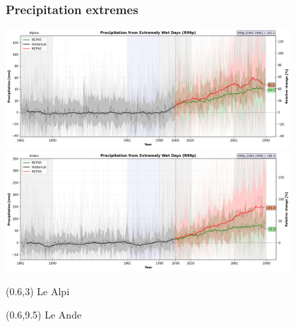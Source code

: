 
\begin{frame}
\frametitle{Precipitation extremes}
\begin{center}

{\includegraphics[width=0.8\textwidth]{risultati/r99p_Alpine_Models_ts}}
{\includegraphics[width=0.8\textwidth]{risultati/r99p_Andes_Models_ts}}
\end{center}

{
  \scriptsize
  \begin{textblock}{1.8}(0.6,3)
     {\color{gray} Le Alpi}
  \end{textblock}
}


{
  \scriptsize
  \begin{textblock}{1.8}(0.6,9.5)
     {\color{gray} Le Ande}
  \end{textblock}
}

\end{frame}

%
